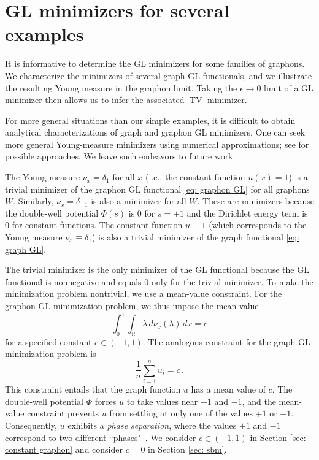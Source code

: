 \documentclass[11pt]{amsart}
\def\R{\mathbb{R}}
\def\ep{\epsilon}
\def\ra{\rightarrow}
\def\TV{\operatorname{TV}}
\numberwithin{equation}{section}
\begin{document}
{%

\section{{GL minimizers} for several examples}\label{sec: examples}

It is informative to {determine} the GL minimizers for some families of graphons. We characterize the minimizers of several graph GL functionals, and we illustrate the resulting Young measure in the graphon limit. Taking the $\ep \ra 0$ limit of a GL minimizer then allows us to infer the associated $\TV$ minimizer.

For more general situations than our simple examples, it is difficult to obtain analytical characterizations of graph and graphon GL minimizers. One can seek more general Young-measure minimizers using numerical approximations; see \cite{nicolaides1993computation, carstensen2000numerical} for possible approaches. We leave such endeavors to future work.



The Young measure $\nu_x = \delta_{1}$ for all $x$ (i.e., the constant function $u(x) = 1$) is a 
trivial minimizer of the graphon GL functional \eqref{eq: graphon GL} for all graphons $W$. Similarly, $\nu_x = \delta_{-1}$ is also a minimizer for all $W$. These are minimizers because the double-well potential $\Phi(s)$ is $0$ for $s = \pm 1$ and the Dirichlet energy term is $0$ for constant functions. {The constant function $u\equiv 1$ (which corresponds to the Young measure $\nu_x \equiv \delta_{1}$}) is also a trivial minimizer of the graph functional \eqref{eq: graph GL}. 

The trivial minimizer is the only minimizer of the GL functional because the GL functional is nonnegative and equals $0$ only for the trivial minimizer. To make the minimization problem nontrivial, we use {a mean-value constraint.}
For the graphon GL-minimization problem, we thus {impose the mean value}
\begin{equation}\label{eq: graphon mean-value constraint}
    \int_0^1 \int_{\R} \lambda \, d\nu_x(\lambda) \,dx = c
\end{equation}
for a {specified} constant $c \in (-1,1)$. The analogous {constraint} for the graph GL-minimization problem is 
\begin{equation}\label{eq: graph mean-value constraint}
    \frac{1}{n} \sum_{i = 1}^n u_i = c \,. 
\end{equation}
This constraint entails that the graph function $u$ has a mean value of $c$. The double-well potential $\Phi$ forces $u$ to take values near $+1$ and $-1$, and the mean-value constraint prevents $u$ from settling at only one of the values $+1$ or $-1$. Consequently, $u$ exhibits a \textit{phase separation}, where the values $+1$ and $-1$ correspond to two different ``phases"~\cite{du2020phase}. 
We consider $c \in (-1,1)$ in Section \ref{sec: constant graphon} and consider $c = 0$ in Section \ref{sec: sbm}. 


}
\end{document}
